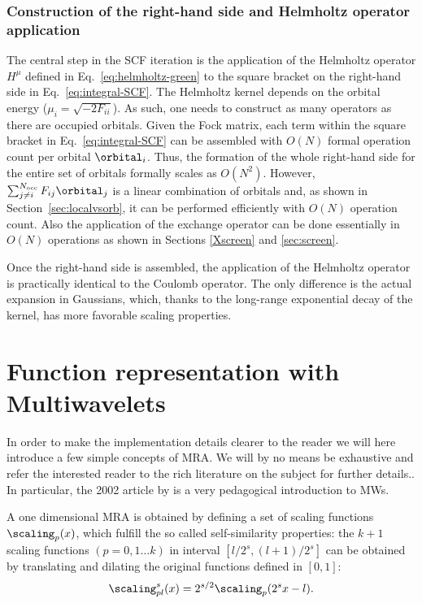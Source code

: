\subsubsection{Construction of the right-hand side and Helmholtz operator application}\label{sec:rhs}
The central step in the SCF iteration is the application of the Helmholtz operator $H^{\mu}$ defined in Eq.~\eqref{eq:helmholtz-green} to the square bracket on the right-hand side in Eq.~\eqref{eq:integral-SCF}. The Helmholtz kernel depends on the orbital energy ($\mu_i = \sqrt{-2F_{ii}}$). As such, one needs to construct as many operators as there are occupied orbitals. Given the Fock matrix, each term within the square bracket in Eq.~\eqref{eq:integral-SCF} can be assembled with $O(N)$ formal operation count per orbital $\orbital_i$. Thus, the formation of the whole right-hand side for the entire set of orbitals formally scales as $O(N^{2})$. However, $\sum_{j \ne i}^{N_{\mathrm{occ}}} F_{ij} \orbital_j $ is a linear combination of orbitals and, as shown in Section~\ref{sec:localvsorb}, it can be performed efficiently with $O(N)$ operation count. Also the application of the exchange operator can be done essentially in $O(N)$ operations as shown in Sections \ref{Xscreen} and \ref{sec:screen}.

Once the right-hand side is assembled, the application of the Helmholtz operator is practically identical to the Coulomb operator. The only difference is the actual expansion in Gaussians, which, thanks to the long-range exponential decay of the kernel, has more favorable scaling properties.\cite{Frediani.10.1080/00268976.2013.810793} 

\section{Function representation with Multiwavelets}\label{sec:func_rep}

In order to make the implementation details clearer to the reader we will here introduce a few simple concepts of \ac{MRA}. We will by no means be exhaustive and refer the interested reader to the rich literature on the subject for further details.\cite{Alpert:2002cx,Frediani.10.1080/00268976.2013.810793,Beylkin.10.1002/cpa.3160440202,Bischoff2019-mr}. In particular, the 2002 article by \citeauthor{Alpert:2002cx} is a very pedagogical introduction to \acp{MW}.~\cite{Alpert:2002cx}

A one dimensional \ac{MRA} is obtained by defining a set of scaling functions $\scaling_p(x)$, which fulfill the so called self-similarity properties:
the $k+1$ scaling functions $(p=0,1 \ldots k)$ in interval $[l/2^s,(l+1)/2^s]$ can be obtained by translating and dilating the original functions defined in $[0,1]$:
\begin{equation}
    \scaling^s_{pl}(x) = 2^{s/2} \scaling_p(2^s x - l).
\end{equation}

